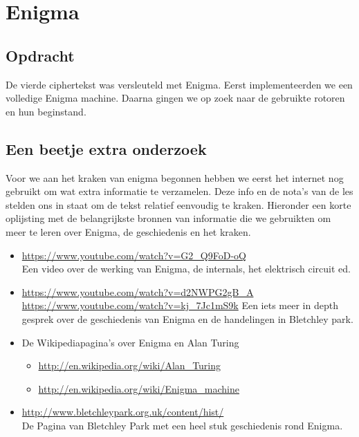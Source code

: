 
\section{Enigma}
\subsection{Opdracht}
De vierde ciphertekst was versleuteld met Enigma. Eerst implementeerden we een volledige Enigma machine. Daarna gingen we op zoek naar de gebruikte rotoren en hun beginstand. 

\subsection{Een beetje extra onderzoek}
Voor we aan het kraken van enigma begonnen hebben we eerst het internet nog gebruikt om wat extra informatie te verzamelen. Deze info en de nota's van de les stelden ons in staat om de tekst relatief eenvoudig te kraken.
Hieronder een korte oplijsting met de belangrijkste bronnen van informatie die we gebruikten om meer te leren over Enigma, de geschiedenis en het kraken.

\begin{itemize}
\item \url{https://www.youtube.com/watch?v=G2_Q9FoD-oQ} \\
	Een video over de werking van Enigma, de internals, het elektrisch circuit ed.
\item \url{https://www.youtube.com/watch?v=d2NWPG2gB_A}
\url{https://www.youtube.com/watch?v=kj_7Jc1mS9k}
Een iets meer in depth gesprek over de geschiedenis van Enigma en de handelingen in Bletchley park.
\item De Wikipediapagina's over Enigma en Alan Turing
	\begin{itemize}
		\item \url{http://en.wikipedia.org/wiki/Alan_Turing}
		\item \url{http://en.wikipedia.org/wiki/Enigma_machine}
	\end{itemize}
	\item \url{http://www.bletchleypark.org.uk/content/hist/} \\ De Pagina van Bletchley Park met een heel stuk geschiedenis rond Enigma.
\end{itemize}


